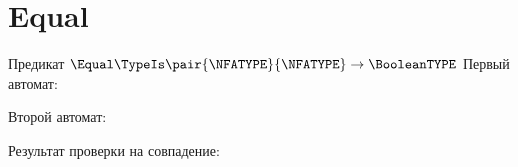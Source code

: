 \section{Equal}
\begin{frame}{Предикат $\Equal\TypeIs\pair{\NFATYPE}{\NFATYPE}\to\BooleanTYPE$}
	Первый автомат:


	Второй автомат:


	Результат проверки на совпадение:

\end{frame}
